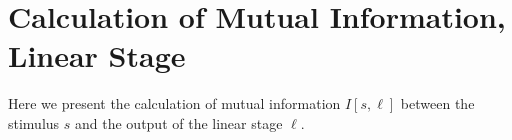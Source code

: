 \documentclass[11pt]{article}
\begin{document}
	\newpage
	
	\section{Calculation of Mutual Information, Linear Stage}
	\label{mutual-linear}
	Here we present the calculation of mutual information $I[s, \boldsymbol{\ell}]$ between the stimulus $s$ and the output of the linear stage $\boldsymbol{\ell}$.
	
\end{document}
